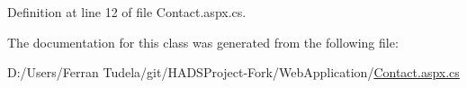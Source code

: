 Definition at line 12 of file Contact.\+aspx.\+cs.



The documentation for this class was generated from the following file\+:\begin{DoxyCompactItemize}
\item 
D\+:/\+Users/\+Ferran Tudela/git/\+H\+A\+D\+S\+Project-\/\+Fork/\+Web\+Application/\mbox{\hyperlink{Contact_8aspx_8cs}{Contact.\+aspx.\+cs}}\end{DoxyCompactItemize}
